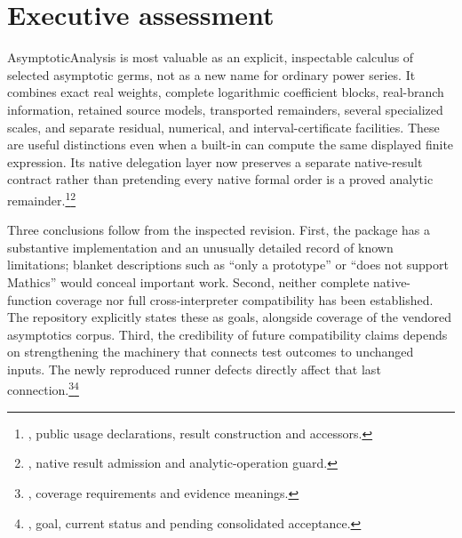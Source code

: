 \documentclass[11pt,letterpaper]{article}
\newcommand{\src}[2]{\footnote{\cite{#1}, #2.}}
\begin{document}
\section{Executive assessment}

AsymptoticAnalysis is most valuable as an explicit, inspectable calculus of selected asymptotic germs, not as a new name for ordinary power series. It combines exact real weights, complete logarithmic coefficient blocks, real-branch information, retained source models, transported remainders, several specialized scales, and separate residual, numerical, and interval-certificate facilities. These are useful distinctions even when a built-in can compute the same displayed finite expression. Its native delegation layer now preserves a separate native-result contract rather than pretending every native formal order is a proved analytic remainder.\src{core}{public usage declarations, result construction and accessors}\src{native}{native result admission and analytic-operation guard}

Three conclusions follow from the inspected revision. First, the package has a substantive implementation and an unusually detailed record of known limitations; blanket descriptions such as ``only a prototype'' or ``does not support Mathics'' would conceal important work. Second, neither complete native-function coverage nor full cross-interpreter compatibility has been established. The repository explicitly states these as goals, alongside coverage of the vendored asymptotics corpus. Third, the credibility of future compatibility claims depends on strengthening the machinery that connects test outcomes to unchanged inputs. The newly reproduced runner defects directly affect that last connection.\src{status}{coverage requirements and evidence meanings}\src{compat}{goal, current status and pending consolidated acceptance}
\end{document}
